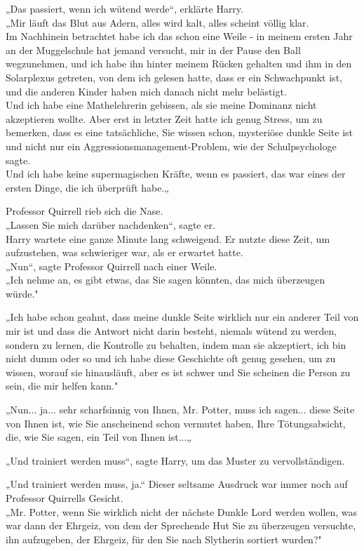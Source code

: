 {„Das passiert, wenn ich wütend werde“, erklärte Harry.\\ „Mir läuft das Blut aus Adern, alles wird kalt, alles scheint völlig klar.\\ Im Nachhinein betrachtet habe ich das schon eine Weile - in meinem ersten Jahr an der Muggelschule hat jemand versucht, mir in der Pause den Ball wegzunehmen, und ich habe ihn hinter meinem Rücken gehalten und ihm in den Solarplexus getreten, von dem ich gelesen hatte, dass er ein Schwachpunkt ist, und die anderen Kinder haben mich danach nicht mehr belästigt.\\ Und ich habe eine Mathelehrerin gebissen, als sie meine Dominanz nicht akzeptieren wollte. Aber erst in letzter Zeit hatte ich genug Stress, um zu bemerken, dass es eine tatsächliche, Sie wissen schon, mysteriöse dunkle Seite ist und nicht nur ein Aggressionsmanagement-Problem, wie der Schulpsychologe sagte.\\ Und ich habe keine supermagischen Kräfte, wenn es passiert, das war eines der ersten Dinge, die ich überprüft habe.„

Professor Quirrell rieb sich die Nase.\\ „Lassen Sie mich darüber nachdenken“, sagte er.\\ Harry wartete eine ganze Minute lang schweigend. Er nutzte diese Zeit, um aufzustehen, was schwieriger war, als er erwartet hatte.\\ „Nun“, sagte Professor Quirrell nach einer Weile.\\ „Ich nehme an, es gibt etwas, das Sie sagen könnten, das mich überzeugen würde."

„Ich habe schon geahnt, dass meine dunkle Seite wirklich nur ein anderer Teil von mir ist und dass die Antwort nicht darin besteht, niemals wütend zu werden, sondern zu lernen, die Kontrolle zu behalten, indem man sie akzeptiert, ich bin nicht dumm oder so und ich habe diese Geschichte oft genug gesehen, um zu wissen, worauf sie hinausläuft, aber es ist schwer und Sie scheinen die Person zu sein, die mir helfen kann."

„Nun... ja... sehr scharfsinnig von Ihnen, Mr. Potter, muss ich sagen... diese Seite von Ihnen ist, wie Sie anscheinend schon vermutet haben, Ihre Tötungsabsicht, die, wie Sie sagen, ein Teil von Ihnen ist...„

„Und trainiert werden muss“, sagte Harry, um das Muster zu vervollständigen.

„Und trainiert werden muss, ja.“ Dieser seltsame Ausdruck war immer noch auf Professor Quirrells Gesicht.\\ „Mr. Potter, wenn Sie wirklich nicht der nächste Dunkle Lord werden wollen, was war dann der Ehrgeiz, von dem der Sprechende Hut Sie zu überzeugen versuchte, ihn aufzugeben, der Ehrgeiz, für den Sie nach Slytherin sortiert wurden?"

}
